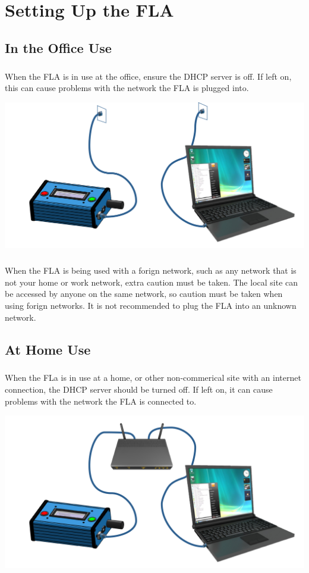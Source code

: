 \documentclass[11pt, oneside]{book}
\begin{document}
\chapter{Setting Up the FLA}
\section{In the Office Use}\label{sec:setting_fla_in_office}
\paragraph{  }
When the FLA is in use at the office, ensure the DHCP server is off. If left on, this can cause problems with the network the FLA is plugged into.
\begin{center}
\includegraphics[width=.9\linewidth]{../media/graphics/fla_in_office}
\end{center}
\paragraph{  }
When the FLA is being used with a forign network, such as any network that is not your home or work network, extra caution must be taken. The local site can be accessed by anyone on the same network, so caution must be taken when using forign networks. It is not recommended to plug the FLA into an unknown network.
\section{At Home Use}\label{sec:setting_fla_at_home}
\paragraph{  }
When the FLa is in use at a home, or other non-commerical site with an internet connection, the DHCP server should be turned off. If left on, it can cause problems with the network the FLA is connected to.
\begin{center}
\includegraphics[width=.9\linewidth]{../media/graphics/fla_at_home}
\end{center}
\end{document}
